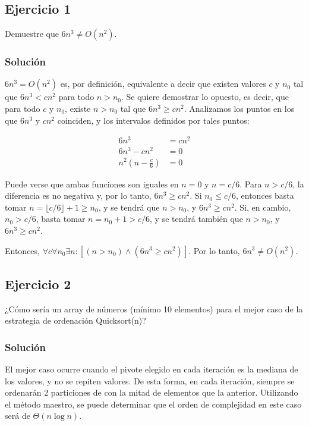 \documentclass{article}
\begin{document}



\subsection*{Ejercicio 1}
Demuestre que $6n^3 \neq O(n^2)$.

\subsubsection*{Solución}
$6n^3 = O(n^2)$ es, por definición, equivalente a decir que existen valores $c$ y $n_0$ tal que $6n^3 < c n^2$ para todo $n > n_0$. Se quiere demostrar lo opuesto, es decir, que para todo $c$ y $n_0$, existe $n > n_0$ tal que $6n^3 \geq c n^2$. Analizamos los puntos en los que $6n^3$ y $cn^2$ coinciden, y los intervalos definidos por tales puntos:

\begin{align*}
    6n^3 &= cn^2 \\
    6n^3 - cn^2 &= 0 \\
    n^2 \left (n - \frac{c}{6}\right ) &= 0
\end{align*}

Puede verse que ambas funciones son iguales en $n = 0$ y $n = c/6$. Para $n > c/6$, la diferencia es no negativa y, por lo tanto, $6n^3 \geq c n^2$. Si $n_0 \leq c/6$, entonces basta tomar $n = \lfloor c/6 \rfloor + 1 \geq n_0$, y se tendrá que $n > n_0$, y $6n^3 \geq c n^2$. Si, en cambio, $n_0 > c/6$, basta tomar $n = n_0 + 1 > c/6$, y se tendrá también que $n > n_0$, y $6n^3 \geq c n^2$.

Entonces, $\forall c \forall n_0 \exists n : [(n > n_0) \land (6n^3 \geq c n^2)]$. Por lo tanto, $6n^3 \neq O(n^2)$.


\subsection*{Ejercicio 2}
¿Cómo sería un array de números (mínimo 10 elementos) para el mejor caso de la estrategia de ordenación Quicksort(n)?

\subsubsection*{Solución}
El mejor caso ocurre cuando el pivote elegido en cada iteración es la mediana de los valores, y no se repiten valores. De esta forma, en cada iteración, siempre se ordenarán 2 particiones de con la mitad de elementos que la anterior. Utilizando el método maestro, se puede determinar que el orden de complejidad en este caso será de $\Theta (n \log n)$.
\end{document}
